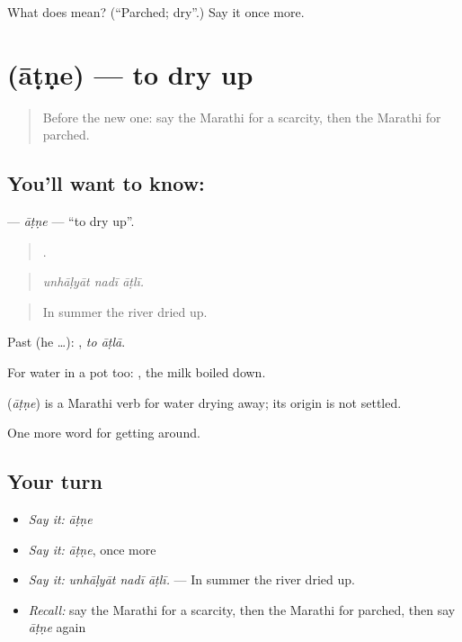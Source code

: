 \begin{tcolorbox}[breakable,colback=teal!4,colframe=teal!35!black,title={Before you move on}]
What does  mean? (\textquotedblleft{}Parched; dry\textquotedblright{}.) Say it once more.
\end{tcolorbox}
\section[\texorpdfstring{\mr{आटणे} (āṭṇe)}{आटणे (āṭṇe)}]{ (āṭṇe) — to dry up}

\label{lesson:MR-C435-atne}



\begin{quote}
Before the new one: say the Marathi for a scarcity, then the Marathi for parched.
\end{quote}

\subsection*{You'll want to know: }
\textbf{} — \emph{āṭṇe} — \textquotedblleft{}to dry up\textquotedblright{}.

\begin{quote}
  .
\end{quote}

\begin{quote}
\emph{unhāḷyāt nadī āṭlī.}
\end{quote}

\begin{quote}
In summer the river dried up.
\end{quote}

Past (he …):  , \emph{to āṭlā}.

For water in a pot too:  , the milk boiled down.

\begin{cousinweb}
\textbf{} (\emph{āṭṇe}) is a Marathi verb for water drying away; its origin is not settled.
\end{cousinweb}

\begin{grammarlens}[title={What you've built}]
One more word for getting around.
\end{grammarlens}

\subsection*{Your turn}
\begin{itemize}
\raggedright
  \item \emph{Say it:} \emph{āṭṇe}
  \item \emph{Say it:} \emph{āṭṇe}, once more
  \item \emph{Say it:} \emph{unhāḷyāt nadī āṭlī.} — In summer the river dried up.
  \item \emph{Recall:} say the Marathi for a scarcity, then the Marathi for parched, then say \emph{āṭṇe} again
\end{itemize}

